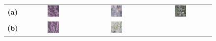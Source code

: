\begin{figure}[!htbp]
    \centering
    \setlength{\tabcolsep}{2pt} %
    \renewcommand{\arraystretch}{1.0} %

    \begin{tabular}{c *{3}{c}}
        \textbf{(a)} &
        \includegraphics[width=0.2\textwidth, height=0.2\textheight, keepaspectratio]{img/qualitative-20/sample_1/sar.png} &
        \includegraphics[width=0.2\textwidth, height=0.2\textheight, keepaspectratio]{img/qualitative-20/sample_1/gen.png} &
        \includegraphics[width=0.2\textwidth, height=0.2\textheight, keepaspectratio]{img/qualitative-20/sample_1/gt.png} \\
        \textbf{(b)} &
        \includegraphics[width=0.2\textwidth, height=0.2\textheight, keepaspectratio]{img/qualitative-20/sample_3/sar.png} &
        \includegraphics[width=0.2\textwidth, height=0.2\textheight, keepaspectratio]{img/qualitative-20/sample_3/gen.png} &

\end{tabular}
\end{figure}
